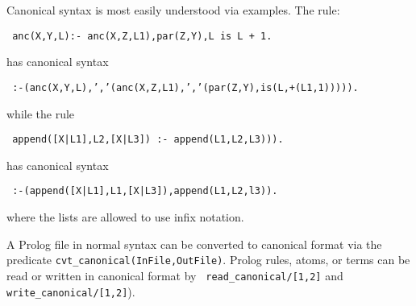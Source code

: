 Canonical syntax is most easily understood via examples.
The rule:

{\tt 
anc(X,Y,L):- anc(X,Z,L1),par(Z,Y),L is L + 1.
}

has canonical syntax

{\tt 
  :-(anc(X,Y,L),','(anc(X,Z,L1),','(par(Z,Y),is(L,+(L1,1))))).
}

while the rule

{\tt 
  append([X|L1],L2,[X|L3]) :- append(L1,L2,L3))).
}

has canonical syntax

{\tt 
:-(append([X|L1],L1,[X|L3]),append(L1,L2,l3)).
}

where the lists are allowed to use infix notation.

A Prolog file in normal syntax can be converted to canonical format
via the predicate {\tt cvt\_canonical(InFile,OutFile)}.  Prolog rules,
atoms, or terms can be read or written in canonical format by {\tt
  read\_canonical/[1,2]} and {\tt write\_canonical/[1,2]}).
